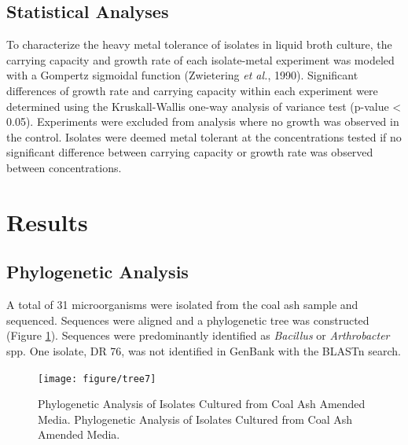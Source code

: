 \documentclass[ms, hidelinks]{uncgdissertationexp3}
\theoremstyle{plain}
\theoremstyle{definition}
\theoremstyle{remark}
\newcommand{\titlecaption}[2]{\caption[#1]{#1. #2}}
\begin{document}
\subsection{Statistical Analyses}\label{statistical-analyses}

To characterize the heavy metal tolerance of isolates in liquid broth culture, the carrying capacity and growth rate of each isolate-metal experiment was modeled with a Gompertz sigmoidal function (Zwietering \emph{et al.}, 1990). Significant differences of growth rate and carrying capacity within each experiment were determined using the Kruskall-Wallis one-way analysis of variance test (p-value \textless{} 0.05). Experiments were excluded from analysis where no growth was observed in the control. Isolates were deemed metal tolerant at the concentrations tested if no significant difference between carrying capacity or growth rate was observed between concentrations.

\section{Results}\label{results-1}
\subsection{Phylogenetic Analysis}\label{phylogenetic-analysis}

A total of 31 microorganisms were isolated from the coal ash sample and sequenced. Sequences were aligned and a phylogenetic tree was constructed (Figure \ref{fig:tree}). Sequences were predominantly identified as \emph{Bacillus} or \emph{Arthrobacter} spp. One isolate, DR 76, was not identified in GenBank with the BLASTn search. 

\begin{figure}[htbp]
  \centering
  \texttt{[image: figure/tree7]}
  \titlecaption{Phylogenetic Analysis of Isolates Cultured from Coal Ash Amended Media}{Phylogenetic Analysis of Isolates Cultured from Coal Ash Amended Media.}\label{fig:tree}
\end{figure}
\FloatBarrier
\end{document}
